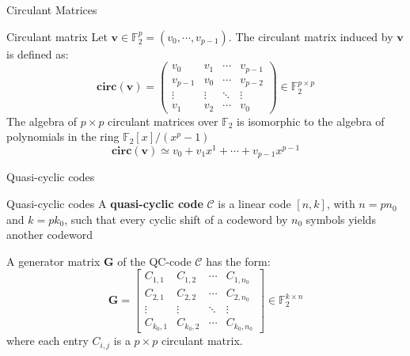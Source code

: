 \begin{frame}{Circulant Matrices}
    \begin{block}{Circulant matrix}
        Let $\mathbf{v} \in \mathds{F}_2^p = (v_0, \cdots, v_{p-1})$. The circulant matrix induced by $\mathbf{v}$ is defined as:
        \begin{equation*}
            \mathbf{circ(v)} = \begin{pmatrix}
                v_0 & v_1 & \cdots & v_{p-1} \\
                v_{p-1} & v_0 & \cdots & v_{p-2} \\
                \vdots & \vdots & \ddots & \vdots \\
                v_1 & v_2 & \cdots & v_0
                \end{pmatrix} \in \mathds{F}_2^{p\times p}
        \end{equation*}
        The algebra of $p \times p$ circulant matrices over $\mathds{F}_2$ is isomorphic to the algebra of polynomials in the ring $\mathds{F}_2[x]/(x^p - 1)$\\
        \begin{equation*}
        \mathbf{circ(v)} \simeq v_0 + v_1x^1 + \cdots + v_{p-1}x^{p-1}
        \end{equation*}
    \end{block}
\end{frame}

\begin{frame}{Quasi-cyclic codes}
    \begin{block}{Quasi-cyclic codes}
        A \textbf{quasi-cyclic code} $\mathcal{C}$ is a linear code $[n, k]$, with $n = pn_0$ and $k=pk_0$, such that every cyclic shift of a codeword by $n_0$ symbols yields another codeword
    \end{block}
    \begin{block}{}
        A generator matrix $\mathbf{G}$ of the QC-code $\mathcal{C}$ has the form:
        \begin{equation*}
            \mathbf{G} = 
            \begin{bmatrix}
                C_{1, 1} & C_{1, 2} & \cdots & C_{1, n_0} \\
                C_{2, 1} & C_{2, 2} & \cdots & C_{2, n_0} \\
                \vdots & \vdots & \ddots & \vdots \\
                C_{k_0, 1} & C_{k_0, 2} & \cdots & C_{k_0, n_0}
                \end{bmatrix} \in \mathds{F}_2^{k \times n}
        \end{equation*}
        where each entry $C_{i, j}$ is a $p \times p$ circulant matrix.
    \end{block}
\end{frame}

